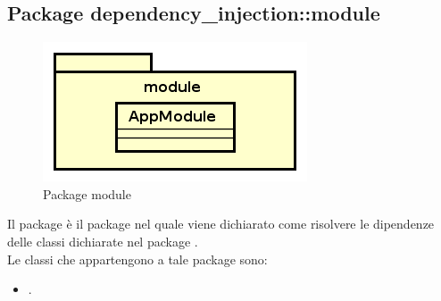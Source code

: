 \documentclass[../Tesi.tex]{subfiles}
\begin{document}
	\subsection{Package dependency\_injection::module}
		\begin{figure}[H]
			\centering
			\includegraphics[scale=0.6]{images/package_diagrams/module}
				\caption{Package module}
		\end{figure}
		Il package  è il package nel quale viene dichiarato come risolvere le dipendenze delle classi dichiarate nel package . \\
		Le classi che appartengono a tale package sono:
		\begin{itemize}
			\item {}.
		\end{itemize}
\end{document}
